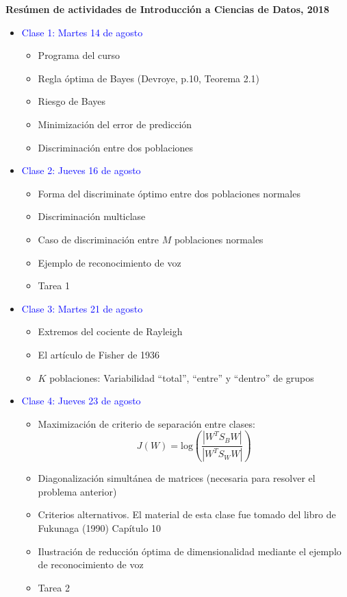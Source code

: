 \documentclass[10pt]{article}
\newcommand {\?}{?`}
\begin{document}
{\sf

\begin{center}
{\large \textbf{Res\'umen de actividades de Introducci\'on a Ciencias de Datos, 2018}}
\end{center}

\bigskip

\begin{itemize}
\item \textcolor{blue}{Clase 1: Martes 14 de agosto}
\begin{itemize}
\item Programa del curso
\item Regla \'optima de Bayes (Devroye, p.10, Teorema 2.1)
\item Riesgo de Bayes
\item Minimizaci\'on del error de predicci\'on
\item Discriminaci\'on entre dos poblaciones
\end{itemize}


\item \textcolor{blue}{Clase 2: Jueves 16 de agosto}
\begin{itemize}
\item Forma del discriminate \'optimo entre dos poblaciones normales
\item Discriminaci\'on multiclase
\item Caso de discriminaci\'on entre $M$ poblaciones normales
\item Ejemplo de reconocimiento de voz
\item Tarea 1
\end{itemize}


\item \textcolor{blue}{Clase 3: Martes 21 de agosto}
\begin{itemize}
\item Extremos del cociente de Rayleigh
\item El art\'iculo de Fisher de 1936
\item $K$ poblaciones: Variabilidad ``total'', ``entre'' y ``dentro'' de grupos
\end{itemize}


\item \textcolor{blue}{Clase 4: Jueves 23 de agosto}
\begin{itemize}
\item Maximizaci\'on de criterio de separaci\'on entre clases:
$$J(W) = \text{log} \left( \frac{|W^TS_BW|}{|W^TS_WW|} \right)$$
\item Diagonalizaci\'on simult\'anea de matrices (necesaria para resolver el 
problema anterior)
\item Criterios alternativos. El material de esta clase fue tomado del libro de Fukunaga (1990) Cap\'itulo 10
\item Ilustraci\'on de reducci\'on \'optima de dimensionalidad mediante el 
ejemplo de reconocimiento de voz
\item Tarea 2
\end{itemize}
\end{itemize}

\bigskip

\begin{center}
\underline{\hspace{15cm}}
\end{center}

}
\end{document}
